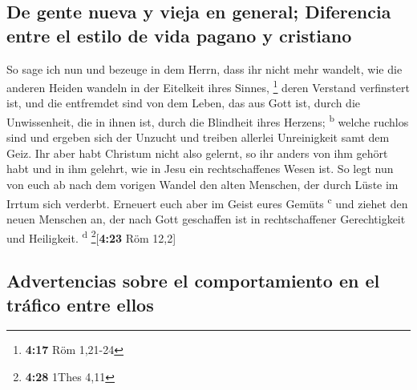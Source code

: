 \hypertarget{de-gente-nueva-y-vieja-en-general-diferencia-entre-el-estilo-de-vida-pagano-y-cristiano}{%
\subsection{De gente nueva y vieja en general; Diferencia entre el
estilo de vida pagano y
cristiano}\label{de-gente-nueva-y-vieja-en-general-diferencia-entre-el-estilo-de-vida-pagano-y-cristiano}}

 So sage ich nun und bezeuge in dem Herrn, dass ihr nicht
mehr wandelt, wie die anderen Heiden wandeln in der Eitelkeit ihres
Sinnes, \footnote{\textbf{4:17} Röm 1,21-24}  deren
Verstand verfinstert ist, und die entfremdet sind von dem Leben, das aus
Gott ist, durch die Unwissenheit, die in ihnen ist, durch die Blindheit
ihres Herzens; \textsuperscript{b}  welche ruchlos sind
und ergeben sich der Unzucht und treiben allerlei Unreinigkeit samt dem
Geiz.  Ihr aber habt Christum nicht also gelernt,
 so ihr anders von ihm gehört habt und in ihm gelehrt,
wie in Jesu ein rechtschaffenes Wesen ist.  So legt nun
von euch ab nach dem vorigen Wandel den alten Menschen, der durch Lüste
im Irrtum sich verderbt.  Erneuert euch aber im Geist
eures Gemüts \textsuperscript{c}  und ziehet den neuen
Menschen an, der nach Gott geschaffen ist in rechtschaffener
Gerechtigkeit und Heiligkeit. \textsuperscript{d}
\footnote{\textbf{4:28} 1Thes 4,11}{[}\textbf{4:23} Röm 12,2{]}

\hypertarget{advertencias-sobre-el-comportamiento-en-el-truxe1fico-entre-ellos}{%
\subsection{Advertencias sobre el comportamiento en el tráfico entre
ellos}\label{advertencias-sobre-el-comportamiento-en-el-truxe1fico-entre-ellos}}

